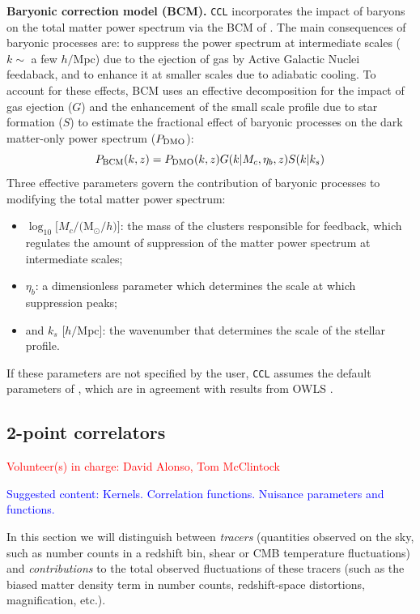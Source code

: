 \documentclass[\docopts]{\docclass}
\newcommand{\vol}[1]{\textcolor{red}{Volunteer(s) in charge: #1}}
\newcommand{\cont}[1]{\textcolor{blue}{Suggested content: #1}}
\newcommand{\ccl}{{\tt CCL}\xspace}
\begin{document}
 {\bf Baryonic correction model (BCM).} \ccl incorporates the impact of baryons on the total matter power spectrum via the BCM of \citet{Schneider15}. The main consequences of baryonic processes are: to suppress the power spectrum at intermediate scales ($k\sim$ a few $h/$Mpc) due to the ejection of gas by Active Galactic Nuclei feedaback, and to enhance it at smaller scales due to adiabatic cooling. To account for these effects, BCM uses an effective decomposition for the impact of gas ejection ($G$) and the enhancement of the small scale profile due to star formation ($S$) to estimate the fractional effect of baryonic processes on the dark matter-only power spectrum ($P_{\rm DMO}$):
\begin{equation}
  P_{\rm BCM}(k,z)=P_{\rm DMO}(k,z) G(k|M_c,\eta_b,z)S(k|k_s)
\end{equation}
Three effective parameters govern the contribution of baryonic processes to modifying the total matter power spectrum:
 \begin{itemize}
   \item $\log_{10} [M_c/($M$_\odot/h)]$: the mass of the clusters responsible for feedback, which regulates the amount of suppression of the matter power spectrum at intermediate scales;
   \item $\eta_b$: a dimensionless parameter which determines the scale at which suppression peaks;
   \item and $k_s$ [$h/$Mpc]: the wavenumber that determines the scale of the stellar profile.
 \end{itemize}
 If these parameters are not specified by the user, \ccl assumes the default parameters of \citet{Schneider15}, which are in agreement with results from OWLS \citep{vanDaalen11}.

\subsection{2-point correlators}
\vol{David Alonso, Tom McClintock}

\cont{Kernels. Correlation functions. Nuisance parameters and functions.}

In this section we will distinguish between {\sl tracers} (quantities observed on the sky, such as number counts in a redshift bin, shear or CMB temperature fluctuations) and {\sl contributions} to the total observed fluctuations of these tracers (such as the biased matter density term in number counts, redshift-space distortions, magnification, etc.).
\end{document}
